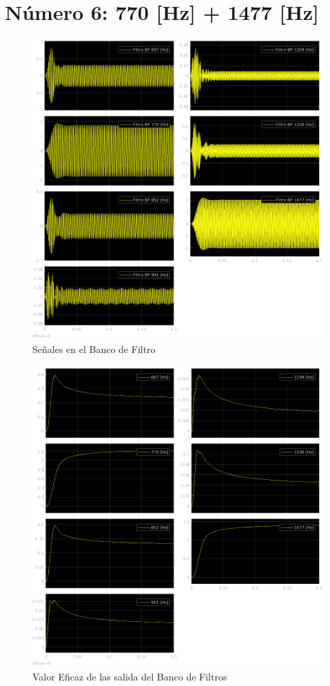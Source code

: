 \section{Número 6: 770 [Hz] + 1477 [Hz]}
\label{sec:signal_6}
\begin{figure}[H]
  \centering
  \includegraphics[width=\linewidth]{images/simulacion/fallas/bank/6.png}
  \caption{Señales en el Banco de Filtro}
  \label{fig:num_6_bank}
\end{figure}

\begin{figure}[H]
  \centering
  \includegraphics[width=\linewidth]{images/simulacion/fallas/rms/6.png}
  \caption{Valor Eficaz de las salida del Banco de Filtros }
  \label{fig:num_6_rms}
\end{figure}

